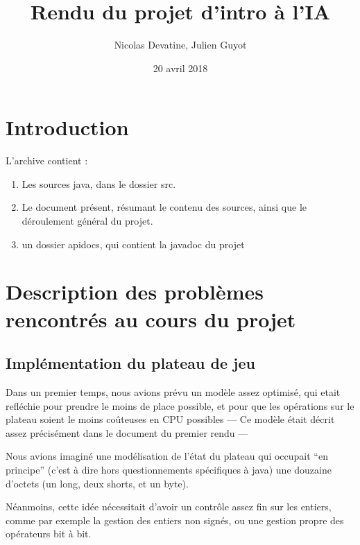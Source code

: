 \documentclass{article}
\author{Nicolas Devatine, Julien Guyot}
\title{Rendu du projet d'intro à l'IA}
\date{20 avril 2018}
\begin{document}
\maketitle
\section{Introduction}

L'archive contient : 
\begin{enumerate}
\item Les sources java, dans le dossier src. 
\item Le document présent, résumant le contenu des sources, ainsi que
  le déroulement général du projet.
\item un dossier apidocs, qui contient la javadoc du projet
\end{enumerate}



\section{Description des problèmes rencontrés au cours du projet}
\subsection{Implémentation du plateau de jeu}
Dans un premier temps, nous avions prévu un modèle assez
optimisé, qui etait refléchie pour prendre le moins de place possible,
et pour que les opérations sur le plateau soient le moins coûteuses en
CPU possibles --- Ce modèle était décrit assez précisément dans le
document du premier rendu ---


Nous avions imaginé une modélisation de l'état du plateau qui occupait
``en principe'' (c'est à dire hors questionnements spécifiques à java)
une douzaine d'octets (un long, deux shorts, et un byte). 


Néanmoins, cette idée nécessitait d'avoir un contrôle assez fin sur les
entiers, comme par exemple la gestion des entiers non signés, ou une
gestion propre des opérateurs bit à bit.
\end{document}
